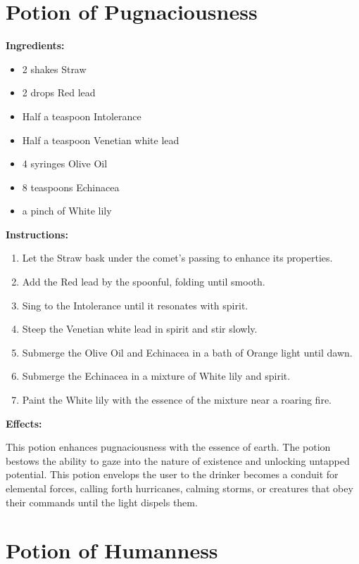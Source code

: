 \documentclass{article}
\begin{document}
\newpage
\section*{Potion of Pugnaciousness}

\textbf{Ingredients:}

\begin{itemize}
  \item 2 shakes Straw
  \item 2 drops Red lead
  \item Half a teaspoon Intolerance
  \item Half a teaspoon Venetian white lead
  \item 4 syringes Olive Oil
  \item 8 teaspoons Echinacea
  \item a pinch of White lily
\end{itemize}

\textbf{Instructions:}

\begin{enumerate}
  \item Let the Straw bask under the comet’s passing to enhance its properties.
  \item Add the Red lead by the spoonful, folding until smooth.
  \item Sing to the Intolerance until it resonates with spirit.
  \item Steep the Venetian white lead in spirit and stir slowly.
  \item Submerge the Olive Oil and Echinacea in a bath of Orange light until dawn.
  \item Submerge the Echinacea in a mixture of White lily and spirit.
  \item Paint the White lily with the essence of the mixture near a roaring fire.
\end{enumerate}

\textbf{Effects:}

This potion enhances pugnaciousness with the essence of earth. The potion bestows the ability to gaze into the nature of existence and unlocking untapped potential. This potion envelops the user to the drinker becomes a conduit for elemental forces, calling forth hurricanes, calming storms, or creatures that obey their commands until the light dispels them.

\newpage
\section*{Potion of Humanness}
\end{document}
